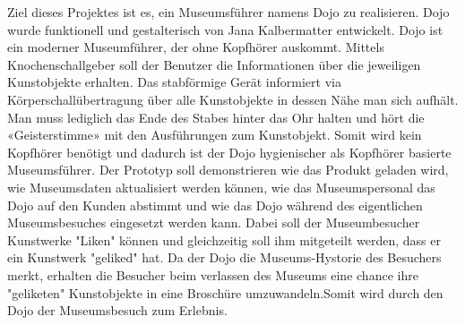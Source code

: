 Ziel dieses Projektes ist es, ein Museumsführer namens Dojo zu realisieren. Dojo wurde funktionell und gestalterisch von Jana Kalbermatter entwickelt. Dojo ist ein moderner Museumführer, der ohne Kopfhörer auskommt. Mittels Knochenschallgeber soll der Benutzer die Informationen über die jeweiligen Kunstobjekte erhalten. Das stabförmige Gerät informiert via Körperschallübertragung über alle Kunstobjekte in dessen Nähe man sich aufhält. Man muss lediglich das Ende des Stabes hinter das Ohr halten und hört die «Geisterstimme» mit den Ausführungen zum Kunstobjekt. Somit wird kein Kopfhörer benötigt und dadurch ist der Dojo hygienischer als Kopfhörer basierte Museumsführer.
Der Prototyp soll demonstrieren wie das Produkt geladen wird, wie Museumsdaten aktualisiert werden können, wie das Museumspersonal das Dojo auf den Kunden abstimmt und wie das Dojo während des eigentlichen Museumsbesuches eingesetzt werden kann. Dabei soll der Museumbesucher Kunstwerke "Liken" können und gleichzeitig soll ihm mitgeteilt werden, dass er ein Kunstwerk "geliked" hat. Da der Dojo die Museums-Hystorie des Besuchers merkt, erhalten die Besucher beim verlassen des Museums eine chance ihre "geliketen" Kunstobjekte in eine Broschüre umzuwandeln.Somit wird durch den Dojo der Museumsbesuch zum Erlebnis.